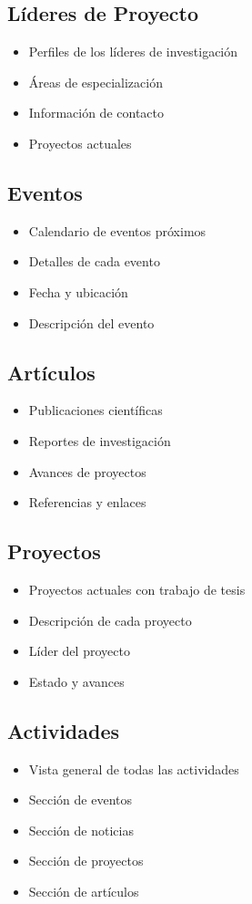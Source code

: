 \documentclass[12pt,letterpaper]{report}
\begin{document}
\subsection{Líderes de Proyecto}
\begin{itemize}
    \item Perfiles de los líderes de investigación
    \item Áreas de especialización
    \item Información de contacto
    \item Proyectos actuales
\end{itemize}

\subsection{Eventos}
\begin{itemize}
    \item Calendario de eventos próximos
    \item Detalles de cada evento
    \item Fecha y ubicación
    \item Descripción del evento
\end{itemize}

\subsection{Artículos}
\begin{itemize}
    \item Publicaciones científicas
    \item Reportes de investigación
    \item Avances de proyectos
    \item Referencias y enlaces
\end{itemize}

\subsection{Proyectos}
\begin{itemize}
    \item Proyectos actuales con trabajo de tesis
    \item Descripción de cada proyecto
    \item Líder del proyecto
    \item Estado y avances
\end{itemize}

\subsection{Actividades}
\begin{itemize}
    \item Vista general de todas las actividades
    \item Sección de eventos
    \item Sección de noticias
    \item Sección de proyectos
    \item Sección de artículos
\end{itemize}
\end{document}

